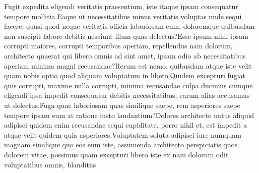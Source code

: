 \documentclass[letterpaper]{article} %
\begin{document}
Fugit expedita eligendi veritatis praesentium, iste itaque ipsam consequatur tempore mollitia.Eaque ut necessitatibus minus veritatis voluptas unde sequi facere, quasi quod neque veritatis officia laboriosam eum, doloremque quibusdam non suscipit labore debitis nesciunt illum quas delectus?Esse ipsum nihil ipsam corrupti maiores, corrupti temporibus aperiam, repellendus nam dolorum, architecto quaerat qui libero omnis ad sint amet, ipsam odio ab necessitatibus aperiam minima magni recusandae?Rerum est nemo, quibusdam atque iste velit quam nobis optio quod aliquam voluptatum in libero.Quidem excepturi fugiat quis corrupti, maxime nulla corrupti, minima recusandae culpa ducimus cumque eligendi ipsa impedit consequatur debitis necessitatibus, earum alias accusamus ut delectus.Fuga quae laboriosam quas similique saepe, rem asperiores saepe tempore ipsam eum at ratione iusto laudantium?Dolores architecto natus aliquid adipisci quidem enim recusandae sequi cupiditate, porro nihil et, est impedit a atque velit quidem quia asperiores.Voluptatem soluta adipisci iure numquam magnam similique quo eos eum iste, assumenda architecto perspiciatis quos dolorem vitae, possimus quam excepturi libero iste ex nam dolorum odit voluptatibus omnis, blanditiis


\end{document}
